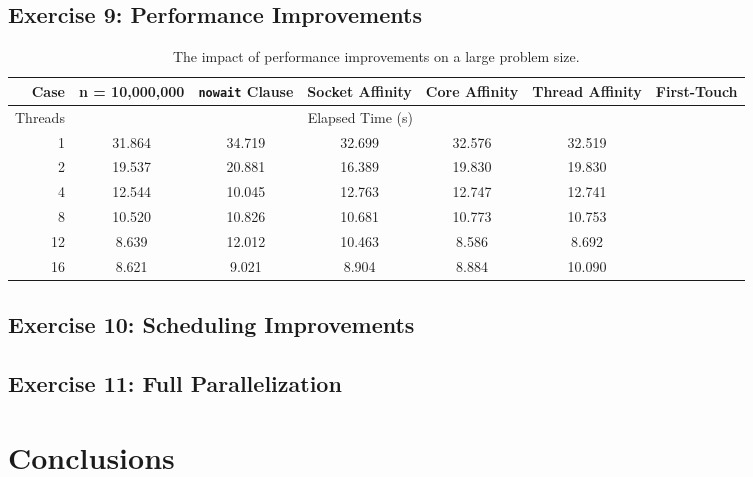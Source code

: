 \documentclass{article}
\begin{document}
\subsection{Exercise 9: Performance Improvements}

\begin{table}[h!]
	\centering
	\caption{The impact of performance improvements on a large problem size.}
	\label{tbl:speedup}
	\begin{tabular}{r|cccccc}
		Case & n = 10,000,000 & \verb|nowait| Clause & Socket Affinity & Core Affinity & Thread Affinity & First-Touch \\
		\hline
		Threads & \multicolumn{5}{c}{Elapsed Time (s)} \\
		\hline
		1 & 31.864 & 34.719 & 32.699 & 32.576 & 32.519 &  \\
		2 & 19.537 & 20.881 & 16.389 & 19.830 & 19.830 &  \\
		4 & 12.544 & 10.045 & 12.763 & 12.747 & 12.741 &  \\
		8 & 10.520 & 10.826 & 10.681 & 10.773 & 10.753 &  \\
		12 & 8.639 & 12.012 & 10.463 & 8.586 & 8.692 &  \\
		16 & 8.621 & 9.021 & 8.904 & 8.884 & 10.090 & 
	\end{tabular}
\end{table}

\subsection{Exercise 10: Scheduling Improvements}

\subsection{Exercise 11: Full Parallelization}

\section{Conclusions}
\end{document}
